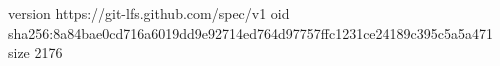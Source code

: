 version https://git-lfs.github.com/spec/v1
oid sha256:8a84bae0cd716a6019dd9e92714ed764d97757ffc1231ce24189c395c5a5a471
size 2176
